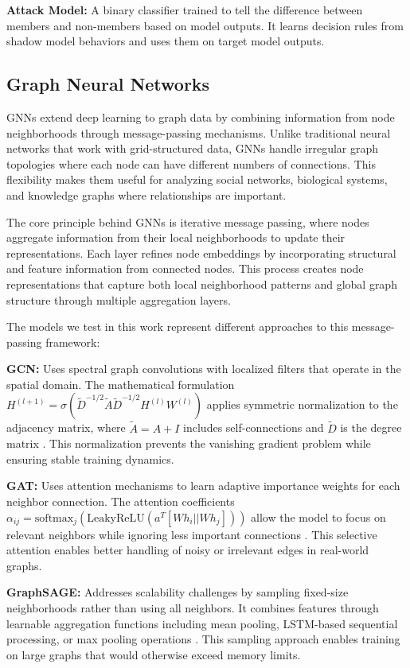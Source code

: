 \documentclass{article}
\begin{document}
\textbf{Attack Model:} A binary classifier trained to tell the difference between members and non-members based on model outputs. It learns decision rules from shadow model behaviors and uses them on target model outputs.

\subsection{Graph Neural Networks}
GNNs extend deep learning to graph data by combining information from node neighborhoods through message-passing mechanisms. Unlike traditional neural networks that work with grid-structured data, GNNs handle irregular graph topologies where each node can have different numbers of connections. This flexibility makes them useful for analyzing social networks, biological systems, and knowledge graphs where relationships are important.

The core principle behind GNNs is iterative message passing, where nodes aggregate information from their local neighborhoods to update their representations. Each layer refines node embeddings by incorporating structural and feature information from connected nodes. This process creates node representations that capture both local neighborhood patterns and global graph structure through multiple aggregation layers.

The models we test in this work represent different approaches to this message-passing framework:

\textbf{GCN:} Uses spectral graph convolutions with localized filters that operate in the spatial domain. The mathematical formulation $H^{(l+1)} = \sigma(\tilde{D}^{-1/2}\tilde{A}\tilde{D}^{-1/2}H^{(l)}W^{(l)})$ applies symmetric normalization to the adjacency matrix, where $\tilde{A} = A + I$ includes self-connections and $\tilde{D}$ is the degree matrix \cite{kipf2017semi}. This normalization prevents the vanishing gradient problem while ensuring stable training dynamics.

\textbf{GAT:} Uses attention mechanisms to learn adaptive importance weights for each neighbor connection. The attention coefficients $\alpha_{ij} = \text{softmax}_j(\text{LeakyReLU}(a^T[Wh_i||Wh_j]))$ allow the model to focus on relevant neighbors while ignoring less important connections \cite{velickovic2018graph}. This selective attention enables better handling of noisy or irrelevant edges in real-world graphs.

\textbf{GraphSAGE:} Addresses scalability challenges by sampling fixed-size neighborhoods rather than using all neighbors. It combines features through learnable aggregation functions including mean pooling, LSTM-based sequential processing, or max pooling operations \cite{hamilton2017inductive}. This sampling approach enables training on large graphs that would otherwise exceed memory limits.
\end{document}
